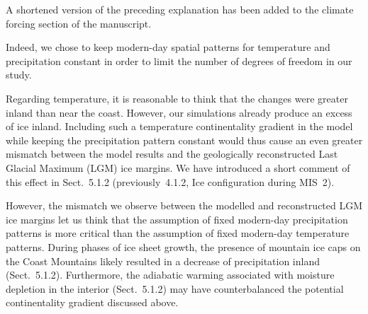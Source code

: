 A shortened version of the preceding explanation has been added to the climate
forcing section of the manuscript.


Indeed, we chose to keep modern-day spatial patterns for temperature and
precipitation constant in order to limit the number of degrees of freedom in
our study.

Regarding temperature, it is reasonable to think that the changes were greater
inland than near the coast. However, our simulations already produce an
excess of ice inland. Including such a temperature continentality gradient
in the model while keeping the precipitation pattern constant would thus cause
an even greater mismatch between the model results and the geologically
reconstructed Last Glacial Maximum (LGM) ice margins. We have introduced a
short comment of this effect in Sect.~5.1.2 (previously~4.1.2, Ice
configuration during MIS~2).

However, the mismatch we observe between the modelled and reconstructed LGM ice
margins let us think that the assumption of fixed modern-day precipitation
patterns is more critical than the assumption of fixed modern-day temperature
patterns. During phases of ice sheet growth, the presence of mountain ice caps
on the Coast Mountains likely resulted in a decrease of precipitation inland
(Sect.~5.1.2). Furthermore, the adiabatic warming associated with moisture
depletion in the interior (Sect.~5.1.2) may have counterbalanced the potential
continentality gradient discussed above.

